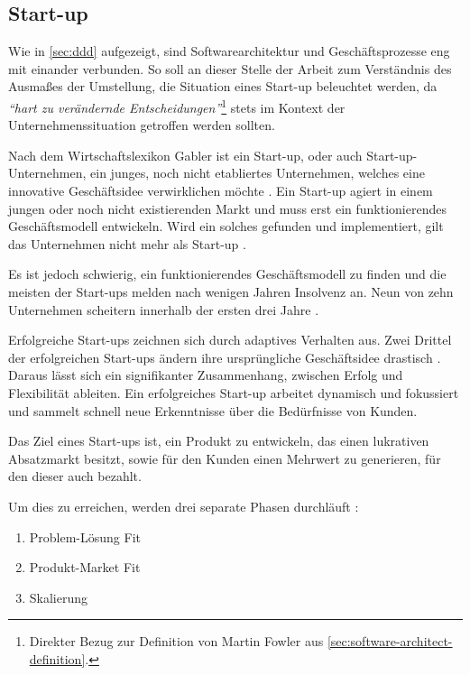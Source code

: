 \subsection{Start-up}
\label{sec:start-up}

Wie in \cref{sec:ddd} aufgezeigt, sind Softwarearchitektur und Geschäftsprozesse eng mit einander verbunden. So soll an dieser Stelle der Arbeit zum Verständnis des Ausmaßes der Umstellung, die Situation eines Start-up beleuchtet werden, da \textit{\enquote{hart zu verändernde Entscheidungen}}\footnote{Direkter Bezug zur Definition von Martin Fowler aus \cref{sec:software-architect-definition}.} stets im Kontext der Unternehmenssituation getroffen werden sollten.

Nach dem Wirtschaftslexikon Gabler ist ein Start-up, oder auch Start-up-Unternehmen, ein junges, noch nicht etabliertes Unternehmen, welches eine innovative Geschäftsidee verwirklichen möchte \parencite[vgl.][]{achleitner_start-up_2018}. Ein Start-up agiert in einem jungen oder noch nicht existierenden Markt und muss erst ein funktionierendes Geschäftsmodell entwickeln. Wird ein solches gefunden und implementiert, gilt das Unternehmen nicht mehr als Start-up \parencite[vgl.][]{wiki_start-up-unternehmen_2020}.

Es ist jedoch schwierig, ein funktionierendes Geschäftsmodell zu finden und die meisten der Start-ups melden nach  wenigen Jahren Insolvenz an. Neun von zehn Unternehmen scheitern innerhalb der ersten drei Jahre \parencite[vgl.][]{patel_startups-fail_2015}.

Erfolgreiche Start-ups zeichnen sich durch adaptives Verhalten aus. Zwei Drittel der erfolgreichen Start-ups ändern  ihre ursprüngliche Geschäftsidee drastisch \parencite{mullins_getting_2009}. Daraus lässt sich ein signifikanter Zusammenhang, zwischen Erfolg und Flexibilität ableiten. Ein erfolgreiches Start-up arbeitet dynamisch und fokussiert und sammelt schnell neue Erkenntnisse über die Bedürfnisse von Kunden.

Das Ziel eines Start-ups ist, ein Produkt zu entwickeln, das einen lukrativen Absatzmarkt besitzt, sowie für den Kunden einen Mehrwert zu generieren, für den dieser auch bezahlt.

Um dies zu erreichen, werden drei separate Phasen durchläuft \parencite[vgl.][S. 8 f.]{maurya_running_2012}: 
\begin{enumerate}
	\item Problem-Lösung Fit
	\item Produkt-Market Fit
	\item Skalierung
\end{enumerate}

